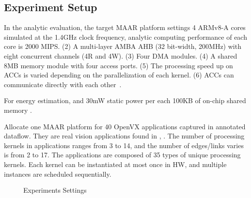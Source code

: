 \subsection{Experiment Setup}
\label{subsec:res-setup}

In the analytic evaluation, the target MAAR platform settings  4 ARMv8-A cores simulated at the 1.4GHz clock frequency, analytic computing performance of each core is 2000 MIPS. (2) A multi-layer AMBA AHB (32 bit-width, 200MHz) with eight concurrent channels (4R and 4W). (3) Four DMA modules. (4) A shared 8MB memory module with four access ports. (5) The processing speed up on ACCs is varied depending on the parallelization of each kernel. (6) ACCs can communicate directly with each other~\cite{teimouri2016improving}. 

For energy estimation,  and 30mW static power per each 100KB of on-chip shared memory \cite{malladi2012towards}.

Allocate one MAAR platform for 40 OpenVX applications captured in annotated dataflow. 
They are real vision applications found in \cite{Intel}, \cite{AMD}. 
The number of processing kernels in applications ranges from 3 to 14, and the number of edges/links varies is from 2 to 17. 
The applications are composed of 35 types of unique processing kernels.
Each kernel can be instantiated at most once in HW, and multiple instances are scheduled sequentially.

\begin{figure}[h]
\vspace{-8pt}
	\centering
		\hfill
		\hfill
	\vspace{-8pt}
	\caption{Experiments Settings}
	\label{fig:avg}
\end{figure}

